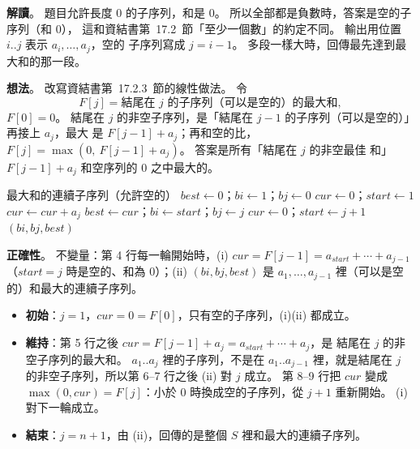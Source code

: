 \begin{pastsoln}
\textbf{解讀}。 題目允許長度 $0$ 的子序列，和是 $0$。 所以全部都是負數時，答案是空的子序列（和 $0$），
這和資結書第~17.2~節「至少一個數」的約定不同。 輸出用位置 $i..j$ 表示 $a_i, \ldots, a_j$，空的
子序列寫成 $j = i - 1$。 多段一樣大時，回傳最先達到最大和的那一段。

\textbf{想法}。 改寫資結書第~17.2.3~節的線性做法。 令
\[
F[j] = \text{結尾在 } j \text{ 的子序列（可以是空的）的最大和},
\]
$F[0] = 0$。 結尾在 $j$ 的非空子序列，是「結尾在 $j - 1$ 的子序列（可以是空的）」再接上 $a_j$，最大
是 $F[j-1] + a_j$；再和空的比，$F[j] = \max(0,\ F[j-1] + a_j)$。 答案是所有「結尾在 $j$ 的非空最佳
和」$F[j-1] + a_j$ 和空序列的 $0$ 之中最大的。

\begin{pseudo}{最大和的連續子序列（允許空的）}
    \State $\mathit{best} \gets 0$；$\mathit{bi} \gets 1$；$\mathit{bj} \gets 0$ 
    \State $\mathit{cur} \gets 0$；$\mathit{start} \gets 1$
        \State $\mathit{cur} \gets \mathit{cur} + a_j$
            \State $\mathit{best} \gets \mathit{cur}$；$\mathit{bi} \gets \mathit{start}$；$\mathit{bj} \gets j$
        \EndIf
            \State $\mathit{cur} \gets 0$；$\mathit{start} \gets j + 1$ 
        \EndIf
    \EndFor
    \State \Return $(\mathit{bi}, \mathit{bj}, \mathit{best})$
\EndFunction
\end{pseudo}

\textbf{正確性}。 不變量：第 4 行每一輪開始時，(i) $\mathit{cur} = F[j-1] = a_{\mathit{start}} + \cdots
+ a_{j-1}$（$\mathit{start} = j$ 時是空的、和為 $0$）；(ii) $(\mathit{bi}, \mathit{bj}, \mathit{best})$
是 $a_1, \ldots, a_{j-1}$ 裡（可以是空的）和最大的連續子序列。
\begin{itemize}
\item \textbf{初始}：$j = 1$，$\mathit{cur} = 0 = F[0]$，只有空的子序列，(i)(ii) 都成立。
\item \textbf{維持}：第 5 行之後 $\mathit{cur} = F[j-1] + a_j = a_{\mathit{start}} + \cdots + a_j$，是
結尾在 $j$ 的非空子序列的最大和。 $a_1..a_j$ 裡的子序列，不是在 $a_1..a_{j-1}$ 裡，就是結尾在 $j$
的非空子序列，所以第 6--7 行之後 (ii) 對 $j$ 成立。 第 8--9 行把 $\mathit{cur}$ 變成
$\max(0, \mathit{cur}) = F[j]$：小於 $0$ 時換成空的子序列，從 $j + 1$ 重新開始。 (i) 對下一輪成立。
\item \textbf{結束}：$j = n + 1$，由 (ii)，回傳的是整個 $S$ 裡和最大的連續子序列。
\end{itemize}


\end{pastsoln}
